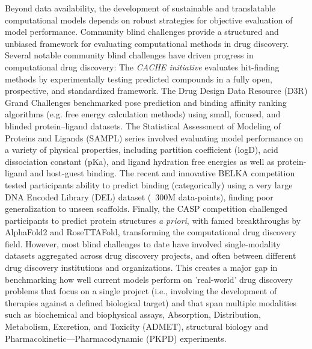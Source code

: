 \documentclass[journal=jcim,manuscript=article]{achemso}
\begin{document}
Beyond data availability, the development of sustainable and translatable computational models depends on robust strategies for objective evaluation of model performance\cite{wognum_call_2024, ash_practically_2024}. Community blind challenges provide a structured and unbiased framework for evaluating computational methods in drug discovery. Several notable community blind challenges have driven progress in computational drug discovery: 
The \textit{CACHE initiative}\cite{ackloo_al-awar_amaro_arrowsmith_azevedo_al._2022} evaluates hit-finding methods by experimentally testing predicted compounds in a fully open, prospective, and standardized framework. The Drug Design Data Resource (D3R) Grand Challenges\cite{parks_gaieb_chiu_yang_shao_walters_jansen_mcgaughey_lewis_bembenek_et} benchmarked pose prediction and binding affinity ranking algorithms (e.g. free energy calculation methods) using small, focused, and blinded protein–ligand datasets. The Statistical Assessment of Modeling of Proteins and Ligands (SAMPL) series\cite{sampl6_2018, sampl7_2022, sampl8_2022, sampl9_2024} involved evaluating model performance on a variety of physical properties, including partition coefficient (logD), acid dissociation constant (pKa), and ligand hydration free energies as well as protein-ligand and host-guest binding. The recent and innovative BELKA competition\cite{quigley2024belka} tested participants ability to predict binding (categorically) using a very large DNA Encoded Library (DEL) dataset (~300M data-points), finding poor generalization to unseen scaffolds. Finally, the CASP competition\cite{casp13_2019, casp14_2021, casp15_2023} challenged participants to predict protein structures \textit{a priori}, with famed breakthroughs by AlphaFold2 and RoseTTAFold, transforming the computational drug discovery field.\cite{jumper_evans_pritzel_green_figurnov_ronneberger_tunyasuvunakool_bates_žídek_2021, baek_2021} However, most blind challenges to date have involved single-modality datasets aggregated across drug discovery projects, and often between different drug discovery institutions and organizations. This creates a major gap in benchmarking how well current models perform on 'real-world' drug discovery problems that focus on a single project (i.e., involving the development of therapies against a defined biological target) and that span multiple modalities such as biochemical and biophysical assays, Absorption, Distribution, Metabolism, Excretion, and Toxicity (ADMET), structural biology and Pharmacokinetic—Pharmacodynamic (PKPD) experiments\cite{wognum_call_2024, volkamer_machine_2023}.
\end{document}
